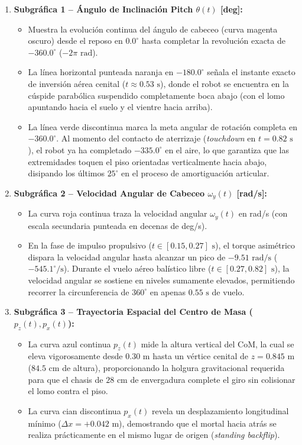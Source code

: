 \documentclass[11pt,a4paper]{article}
\begin{document}
\begin{enumerate}
    \item \textbf{Subgráfica 1 -- Ángulo de Inclinación Pitch $\theta(t)$ [deg]:}
    \begin{itemize}
        \item Muestra la evolución continua del ángulo de cabeceo (curva magenta oscuro) desde el reposo en $0.0^\circ$ hasta completar la revolución exacta de $-360.0^\circ$ ($-2\pi\text{ rad}$).
        \item La línea horizontal punteada naranja en $-180.0^\circ$ señala el instante exacto de inversión aérea cenital ($t \approx 0.53\text{ s}$), donde el robot se encuentra en la cúspide parabólica suspendido completamente boca abajo (con el lomo apuntando hacia el suelo y el vientre hacia arriba).
        \item La línea verde discontinua marca la meta angular de rotación completa en $-360.0^\circ$. Al momento del contacto de aterrizaje (\textit{touchdown} en $t = 0.82\text{ s}$), el robot ya ha completado $-335.0^\circ$ en el aire, lo que garantiza que las extremidades toquen el piso orientadas verticalmente hacia abajo, disipando los últimos $25^\circ$ en el proceso de amortiguación articular.
    \end{itemize}

    \item \textbf{Subgráfica 2 -- Velocidad Angular de Cabeceo $\omega_y(t)$ [rad/s]:}
    \begin{itemize}
        \item La curva roja continua traza la velocidad angular $\omega_y(t)$ en rad/s (con escala secundaria punteada en decenas de deg/s).
        \item En la fase de impulso propulsivo ($t \in [0.15, 0.27]\text{ s}$), el torque asimétrico dispara la velocidad angular hasta alcanzar un pico de $-9.51\text{ rad/s}$ ($-545.1^\circ/\text{s}$). Durante el vuelo aéreo balístico libre ($t \in [0.27, 0.82]\text{ s}$), la velocidad angular se sostiene en niveles sumamente elevados, permitiendo recorrer la circunferencia de $360^\circ$ en apenas $0.55\text{ s}$ de vuelo.
    \end{itemize}

    \item \textbf{Subgráfica 3 -- Trayectoria Espacial del Centro de Masa ($p_z(t), p_x(t)$):}
    \begin{itemize}
        \item La curva azul continua $p_z(t)$ mide la altura vertical del CoM, la cual se eleva vigorosamente desde $0.30\text{ m}$ hasta un vértice cenital de $z = 0.845\text{ m}$ ($84.5\text{ cm}$ de altura), proporcionando la holgura gravitacional requerida para que el chasis de $28\text{ cm}$ de envergadura complete el giro sin colisionar el lomo contra el piso.
        \item La curva cian discontinua $p_x(t)$ revela un desplazamiento longitudinal mínimo ($\Delta x = +0.042\text{ m}$), demostrando que el mortal hacia atrás se realiza prácticamente en el mismo lugar de origen (\textit{standing backflip}).
    \end{itemize}


\end{enumerate}
\end{document}
